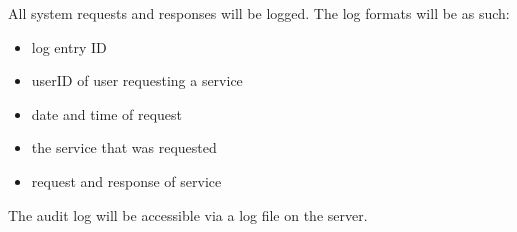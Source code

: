 All system requests and responses will be logged. The log formats will be as such:
\begin{itemize}
	\item log entry ID
	\item userID of user requesting a service
	\item date and time of request
	\item the service that was requested
	\item request and response of service
\end{itemize}
The audit log will be accessible via a log file on the server.